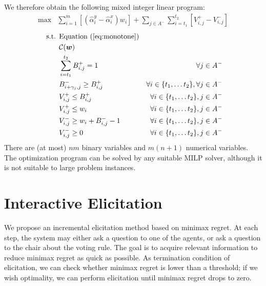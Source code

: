 We therefore obtain the following mixed integer linear program:
\begin{align}
\max & \sum_{i=1}^m  [(\hat{\alpha}_{i}^{y} - \hat{\alpha}_{i}^{x}) w_{i}] +
  \sum_{j \in A^{-}} \sum_{i=t_{1}}^{t_{2}}  [V_{i,j}^{+} - V_{i,j}^{-}]
\end{align}
\begin{align}
\text{ s.t. } &  \text{Equation } (\ref{eq:monotone}) & \\
&  \mathcal{C}(\bm{w}) &  \\
& \sum_{i=t_{1}}^{t_{2}} B_{i,j}^{+} = 1 & \forall j \in A^{-} \\
& B_{i+\gamma_{j},j}^{-} \geq B_{i,j}^{+} & \forall i \in \{ t_{1}, \ldots t_{2}\}, \forall j \in A^{-} \\
& V_{i,j}^{+} \leq B_{i,j}^{+}  & \forall i \in \{ t_{1}, \ldots t_{2}\}, j \in A^{-} \\
& V_{i,j}^{+} \leq w_i & \forall i \in \{ t_{1}, \ldots t_{2}\}, j \in A^{-} \\
& V_{i,j}^{-} \geq w_{i} + B_{i,j}^{-} - 1 & \forall i \in \{ t_{1}, \ldots t_{2}\}, j \in A^{-}\\
& V_{i,j}^{-} \geq 0 & \forall i \in \{ t_{1}, \ldots t_{2}\}, j \in A^{-}
\end{align} 
There are (at most) $nm$ binary variables and $m(n+1)$ numerical variables.
The optimization program can be solved by any suitable MILP solver, although it is not suitable to large problem instances.


\section{Interactive Elicitation} \label{sec:elicit}

We propose an incremental elicitation method based on minimax regret.
At each step, the system may either ask a question to one of the agents, or ask a question to the chair about the voting rule. 
The goal is to acquire relevant information to reduce minimax regret as quick as possible.
As termination condition of elicitation, we can check whether minimax regret is lower than a threshold; if we wish optimality, we can perform elicitation until minimax regret drops to zero.

